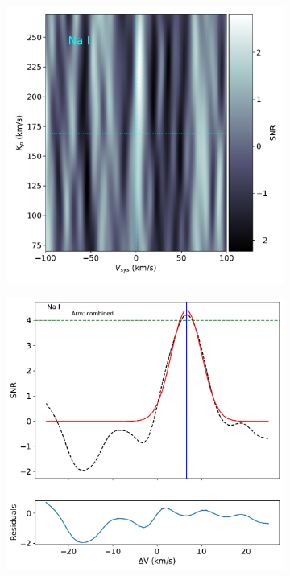 \documentclass[twocolumn]{aastex631}
\begin{document}
\begin{figure}[ht!]
\begin{subfigure}[b]{0.4\textwidth}
                \caption{}\label{fig:1d-ccf-Fe+-combined}
            \end{subfigure}
        
            \begin{subfigure}[b]{0.4\textwidth}
                \includegraphics[width=\textwidth]{plots-updated/kp-vsys-map/combined/KELT-20b.20190504.combined.Na.CCFs-shifted.pdf}
                \caption{}\label{fig:2d-ccf-Na-combined}
            \end{subfigure}
            \begin{subfigure}[b]{0.4\textwidth}
                \includegraphics[width=\textwidth]{plots-updated/line-profile/combined/KELT-20b.20190504.combined.Na.SNR-Gaussian.pdf}

\end{subfigure}
\end{figure}
\end{document}
